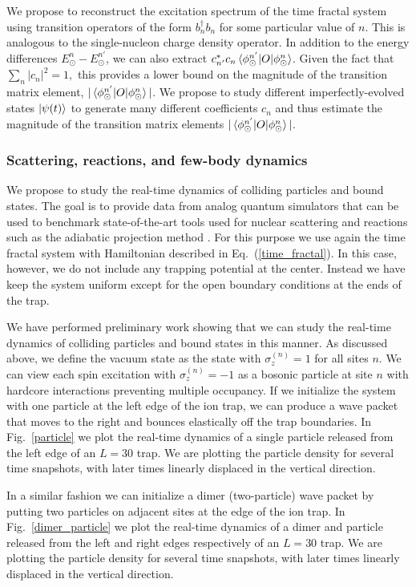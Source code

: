 \documentclass[10pt]{article}
\begin{document}
We propose to reconstruct the excitation spectrum of the time fractal
system using transition operators of the form $b^{\dagger}_n b_n$ for
some particular value of $n$.  This is analogous to the single-nucleon
charge density operator.  In addition to the energy differences
$E^{n}_\odot-E^{n'}_\odot$, we can also extract $c^*_{n'} c_n
\braket{\phi^{n'}_\odot|O|\phi^n_\odot}$.  Given the fact that $\sum_n
|c_n|^2=1,$ this provides a lower bound on the magnitude of the
transition matrix element,
$|\braket{\phi^{n'}_\odot|O|\phi^n_\odot}|$. We propose to study
different imperfectly-evolved states $\ket{\psi(t)}$ to generate many
different coefficients $c_n$ and thus estimate the magnitude of the
transition matrix elements
$|\braket{\phi^{n'}_\odot|O|\phi^n_\odot}|$.
  
\subsubsection{Scattering, reactions, and few-body dynamics}

We propose to study the real-time dynamics of colliding particles and
bound states.  The goal is to provide data from analog quantum
simulators that can be used to benchmark state-of-the-art tools used
for nuclear scattering and reactions such as the adiabatic projection
method \cite{Elhatisari:2015iga}.  For this purpose we use again the
time fractal system with Hamiltonian described in
Eq.~(\ref{time_fractal}).  In this case, however, we do not include
any trapping potential at the center.  Instead we have keep the system
uniform except for the open boundary conditions at the ends of the
trap.

We have performed preliminary work showing that we can study the
real-time dynamics of colliding particles and bound states in this
manner.  As discussed above, we define the vacuum state as the state
with $\sigma_z^{(n)}=1$ for all sites $n$.  We can view each spin
excitation with $\sigma_z^{(n)}=-1$ as a bosonic particle at site $n$
with hardcore interactions preventing multiple occupancy. If we
initialize the system with one particle at the left edge of the ion
trap, we can produce a wave packet that moves to the right and bounces
elastically off the trap boundaries. In Fig.~\ref{particle} we plot
the real-time dynamics of a single particle released from the left
edge of an $L=30$ trap.  We are plotting the particle density for
several time snapshots, with later times linearly displaced in the
vertical direction.

In a similar fashion we can initialize a dimer (two-particle) wave
packet by putting two particles on adjacent sites at the edge of the
ion trap. In Fig.~\ref{dimer_particle} we plot the real-time dynamics
of a dimer and particle released from the left and right edges
respectively of an $L=30$ trap.  We are plotting the particle density
for several time snapshots, with later times linearly displaced in the
vertical direction.
 
\end{document}
